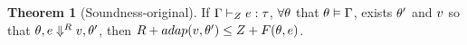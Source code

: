\documentclass[a4paper,11pt]{article}
\theoremstyle{definition}
\newtheorem{thm}{Theorem}
\begin{document}
\begin{thm}[Soundness-original]
\label{soundness}
If $\Gamma \vdash_{Z} e : \tau$, $ \forall \theta$ that $\theta
\vDash \Gamma$, exists $\theta'$ and $v$ so that $\theta , e \mathrel{\Downarrow^{R}} v,
\theta'  $, then  $ R + adap(v, \theta')  \leq  Z + F(\theta, e)$.  
\end{thm}


                                       
\end{document}
